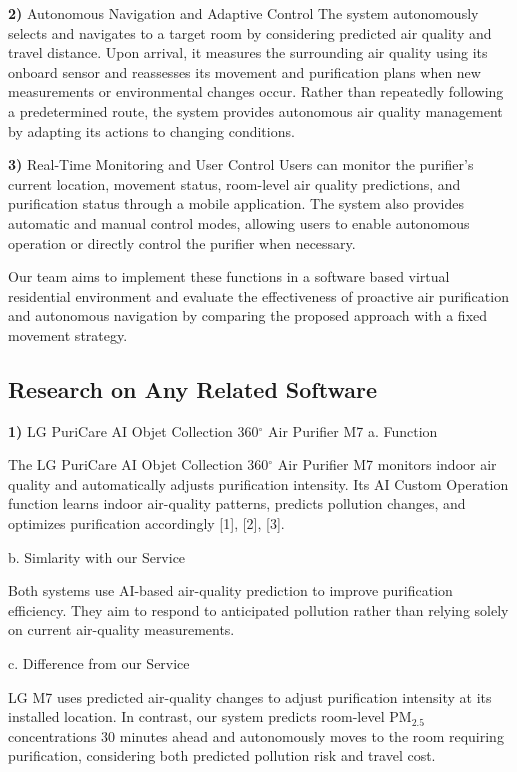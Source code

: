 \documentclass[conference]{IEEEtran}
\begin{document}
\par\noindent\textbf{2)} Autonomous Navigation and Adaptive Control
The system autonomously selects and navigates to a target room by considering predicted air quality and travel distance. Upon arrival, it measures the surrounding air quality using its onboard sensor and reassesses its movement and purification plans when new measurements or environmental changes occur. Rather than repeatedly following a predetermined route, the system provides autonomous air quality management by adapting its actions to changing conditions.

\par\noindent\textbf{3)} Real-Time Monitoring and User Control
Users can monitor the purifier's current location, movement status, room-level air quality predictions, and purification status through a mobile application. The system also provides automatic and manual control modes, allowing users to enable autonomous operation or directly control the purifier when necessary.

Our team aims to implement these functions in a software based virtual residential environment and evaluate the effectiveness of proactive air purification and autonomous navigation by comparing the proposed approach with a fixed movement strategy.

\subsection{Research on Any Related Software}
\par\noindent\textbf{1)} LG PuriCare AI Objet Collection 360$^\circ$ Air Purifier M7
a. Function

The LG PuriCare AI Objet Collection 360$^\circ$ Air Purifier M7 monitors indoor air quality and automatically adjusts purification intensity. Its AI Custom Operation function learns indoor air-quality patterns, predicts pollution changes, and optimizes purification accordingly [1], [2], [3].

b. Simlarity with our Service

Both systems use AI-based air-quality prediction to improve purification efficiency. They aim to respond to anticipated pollution rather than relying solely on current air-quality measurements.

c. Difference from our Service

LG M7 uses predicted air-quality changes to adjust purification intensity at its installed location. In contrast, our system predicts room-level PM$_{2.5}$ concentrations 30 minutes ahead and autonomously moves to the room requiring purification, considering both predicted pollution risk and travel cost.
\end{document}
